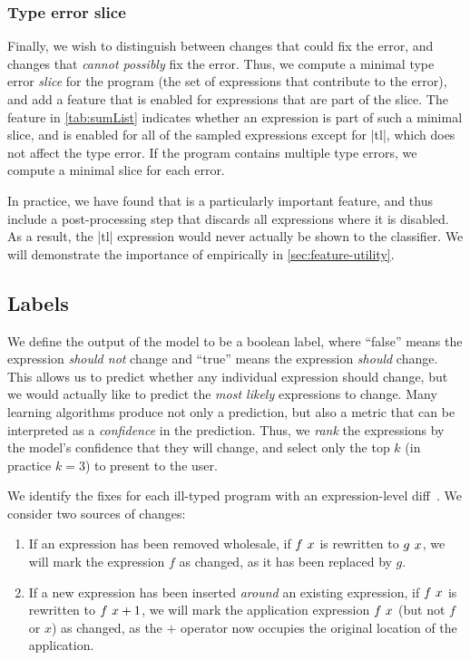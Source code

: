 \subsubsection{Type error slice}
Finally, we wish to distinguish between changes that could fix the
error, and changes that \emph{cannot possibly} fix the error.
%
Thus, we compute a minimal type error \emph{slice} for the program
(\ie the set of expressions that contribute to the error), and add a
feature that is enabled for expressions that are part of the slice.
%
The \InSlice feature in \autoref{tab:sumList} indicates whether an
expression is part of such a minimal slice, and is enabled for all of
the sampled expressions except for |tl|, which does not affect
the type error.
%
If the program contains multiple type errors, we compute
a minimal slice for each error.

In practice, we have found that \InSlice is a particularly important
feature, and thus include a post-processing step that discards all
expressions where it is disabled.
%
As a result, the |tl| expression would never actually be shown to the
classifier.
%
 We will demonstrate the importance of \InSlice empirically in
\autoref{sec:feature-utility}.

\subsection{Labels}
\label{sec:labels}
We define the output of the model to be a boolean label, where ``false''
means the expression \emph{should not} change and ``true'' means the
expression \emph{should} change.
%
This allows us to predict whether any individual expression should
change, but we would actually like to predict the \emph{most likely}
expressions to change.
%
Many learning algorithms produce not only a prediction, but also a
metric that can be interpreted as a \emph{confidence} in the prediction.
%
Thus, we \emph{rank} the expressions by the model's confidence that they
will change, and select only the top $k$ (in practice $k=3$) to present
to the user.

We identify the fixes for each ill-typed program with an
expression-level diff~\citep{Lempsink2009-xf}.
%
We consider two sources of changes:
%
\begin{enumerate}
\item If an expression has been removed wholesale, \eg if $f\ x$
  is rewritten to $g\ x$, we will mark the expression $f$ as
  changed, as it has been replaced by $g$.
\item If a new expression has been inserted \emph{around} an existing
  expression, \eg if $f\ x$ is rewritten to
  $f\ x + 1$, we will mark the application expression
  $f\ x$ (but not $f$ or $x$) as changed, as the $+$ operator now
  occupies the original location of the application.
\end{enumerate}

